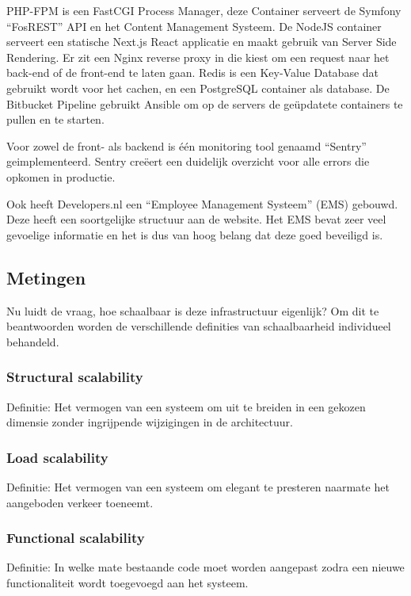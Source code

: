 PHP-FPM is een FastCGI Process Manager, deze Container serveert de Symfony “FosREST” API en het Content Management Systeem. De NodeJS container serveert een statische Next.js React applicatie en maakt gebruik van Server Side Rendering. Er zit een Nginx reverse proxy in die kiest om een request naar het back-end of de front-end te laten gaan. Redis is een Key-Value Database dat gebruikt wordt voor het cachen, en een PostgreSQL container als database. De Bitbucket Pipeline gebruikt Ansible om op de servers de geüpdatete containers te pullen en te starten.

Voor zowel de front- als backend is één monitoring tool genaamd \enquote{Sentry} geimplementeerd. Sentry creëert een duidelijk overzicht voor alle errors die opkomen in productie.

Ook heeft Developers.nl een \enquote{Employee Management Systeem} (EMS) gebouwd. Deze heeft een soortgelijke structuur aan de website. Het EMS bevat zeer veel gevoelige informatie en het is dus van hoog belang dat deze goed beveiligd is.

\subsection{Metingen}

Nu luidt de vraag, hoe schaalbaar is deze infrastructuur eigenlijk? Om dit te beantwoorden worden de verschillende definities van schaalbaarheid individueel behandeld. 

\subsubsection{Structural scalability}
Definitie: Het vermogen van een systeem om uit te breiden in een gekozen dimensie zonder ingrijpende wijzigingen in de architectuur.


\subsubsection{Load scalability}
Definitie: Het vermogen van een systeem om elegant te presteren naarmate het aangeboden verkeer toeneemt.


\subsubsection{Functional scalability}
Definitie: In welke mate bestaande code moet worden aangepast zodra een nieuwe functionaliteit wordt toegevoegd aan het systeem.


